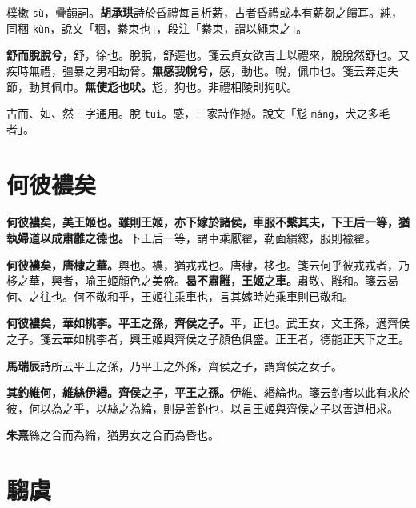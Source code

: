 \begin{quoting}樸樕 \texttt{sù}，疊韻詞。\textbf{胡承珙}詩於昏禮每言析薪，古者昏禮或本有薪芻之饋耳。純，同稇 \texttt{kǔn}，說文「稇，絭束也」，段注「絭束，謂以繩束之」。\end{quoting}

\textbf{舒而脫脫兮，}{\footnotesize 舒，徐也。脫脫，舒遲也。箋云貞女欲吉士以禮來，脫脫然舒也。又疾時無禮，彊暴之男相劫脅。}\textbf{無感我帨兮，}{\footnotesize 感，動也。帨，佩巾也。箋云奔走失節，動其佩巾。}\textbf{無使尨也吠。}{\footnotesize 尨，狗也。非禮相陵則狗吠。}

\begin{quoting}古而、如、然三字通用。脫 \texttt{tuì}。感，三家詩作撼。說文「尨 \texttt{máng}，犬之多毛者」。\end{quoting}

\section{何彼襛矣}


\textbf{何彼襛矣，美王姬也。雖則王姬，亦下嫁於諸侯，車服不繫其夫，下王后一等，猶執婦道以成肅雝之德也。}{\footnotesize 下王后一等，謂車乘厭翟，勒面繢緫，服則褕翟。}

\textbf{何彼襛矣，唐棣之華。}{\footnotesize 興也。襛，猶戎戎也。唐棣，栘也。箋云何乎彼戎戎者，乃栘之華，興者，喻王姬顏色之美盛。}\textbf{曷不肅雝，王姬之車。}{\footnotesize 肅敬、雝和。箋云曷何、之往也。何不敬和乎，王姬往乘車也，言其嫁時始乘車則已敬和。}

\textbf{何彼襛矣，華如桃李。平王之孫，齊侯之子。}{\footnotesize 平，正也。武王女，文王孫，適齊侯之子。箋云華如桃李者，興王姬與齊侯之子顏色俱盛。正王者，德能正天下之王。}

\begin{quoting}\textbf{馬瑞辰}詩所云平王之孫，乃平王之外孫，齊侯之子，謂齊侯之女子。\end{quoting}

\textbf{其釣維何，維絲伊緡。齊侯之子，平王之孫。}{\footnotesize 伊維、緡綸也。箋云釣者以此有求於彼，何以為之乎，以絲之為綸，則是善釣也，以言王姬與齊侯之子以善道相求。}

\begin{quoting}\textbf{朱熹}絲之合而為綸，猶男女之合而為昏也。\end{quoting}

\section{騶虞}

